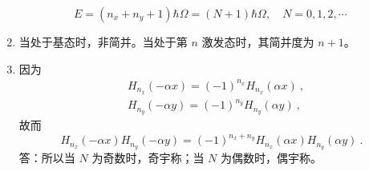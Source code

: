 \begin{enumerate}
\begin{equation}
\end{equation}
\begin{equation}
E=(n_{x}+n_{y}+1)\hbar \Omega=(N+1)\hbar \Omega,\quad N=0,1,2,\cdots~
\end{equation}
\item 当处于基态时，非简并。当处于第 $n$ 激发态时，其简并度为 $n+1$。
\item 因为
\begin{align}
&H_{n_x}(-\alpha x)=(-1)^{n_x}H_{n_x}(\alpha x) ~,\\
&H_{n_y}(-\alpha y)=(-1)^{n_y}H_{n_y}(\alpha y)~,
\end{align}
故而
\begin{equation}
H_{n_x}(-\alpha x)H_{n_y}(-\alpha y)=(-1)^{n_x + n_y}H_{n_x}(\alpha x)H_{n_y}(\alpha y)~.
\end{equation}
答：所以当 $N$ 为奇数时，奇宇称；当 $N$ 为偶数时，偶宇称。
\end{enumerate}
